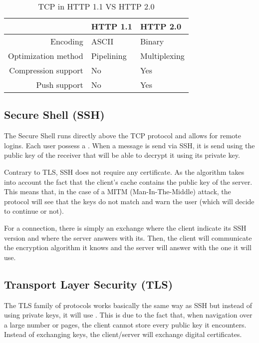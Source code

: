 \begin{table}[H]
	\centering
	\begin{tabular}{r|l|l}
	\hline 
	 & HTTP 1.1 & HTTP 2.0 \\ 
	\hline 
	Encoding & ASCII & Binary \\ 
	\hline 
	Optimization method & Pipelining & Multiplexing \\ 
	\hline 
	Compression support & No & Yes \\ 
	\hline 
	Push support & No & Yes \\ 
	\hline 
	\end{tabular}
	\caption{TCP in HTTP 1.1 VS HTTP 2.0}
\end{table}

\subsection{Secure Shell (SSH)}

The Secure Shell runs directly above the TCP protocol and allows for remote logins. Each user possess a . When a message is send via SSH, it is send using the public key of the receiver that will be able to decrypt it using its private key.

Contrary to TLS, SSH does not require any certificate. As the algorithm takes into account the fact that the client's cache contains the public key of the server. This means that, in the case of a MITM (Man-In-The-Middle) attack, the protocol will see that the keys do not match and warn the user (which will decide to continue or not).

For a connection, there is simply an exchange where the client indicate its SSH version and where the server answers with its. Then, the client will communicate the encryption algorithm it knows and the server will answer with the one it will use.

\subsection{Transport Layer Security (TLS)}

The TLS family of protocols works basically the same way as SSH but instead of using private keys, it will use . This is due to the fact that, when navigation over a large number or pages, the client cannot store every public key it encounters. Instead of exchanging keys, the client/server will exchange digital certificates.

